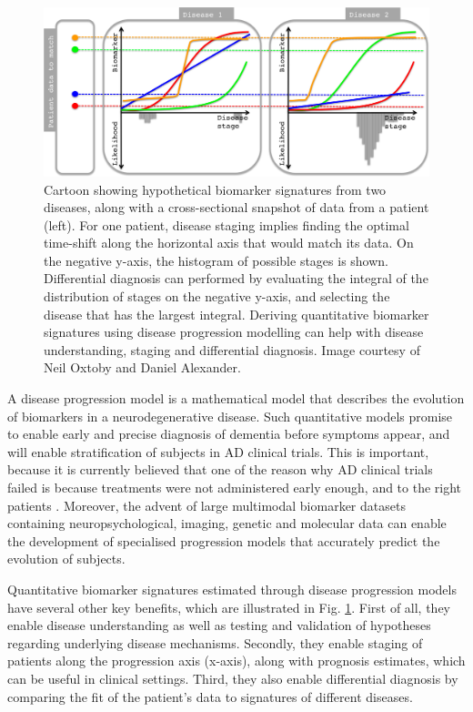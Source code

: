 \begin{figure}
\centering
\includegraphics[width=1\textwidth]{images/dpmDiffDiag2}
\caption[Hypothetical biomarker signatures in two diseases]{Cartoon showing hypothetical biomarker signatures from two diseases, along with a cross-sectional snapshot of data from a patient (left). For one patient, disease staging implies finding the optimal time-shift along the horizontal axis that would match its data. On the negative y-axis, the histogram of possible stages is shown. Differential diagnosis can performed by evaluating the integral of the distribution of stages on the negative y-axis, and selecting the disease that has the largest integral. Deriving quantitative biomarker signatures using disease progression modelling can help with disease understanding, staging and differential diagnosis. Image courtesy of Neil Oxtoby and Daniel Alexander.}
\label{fig:bckDpmImg}
\end{figure}

A disease progression model is a mathematical model that describes the evolution of biomarkers in a neurodegenerative disease. Such quantitative models promise to enable early and precise diagnosis of dementia before symptoms appear, and will enable stratification of subjects in AD clinical trials. This is important, because it is currently believed that one of the reason why AD clinical trials failed is because treatments were not administered early enough, and to the right patients \cite{mehta2017trials}. Moreover, the advent of large multimodal biomarker datasets containing neuropsychological, imaging, genetic and molecular data can enable the development of specialised progression models that accurately predict the evolution of subjects. 

Quantitative biomarker signatures estimated through disease progression models have several other key benefits, which are illustrated in Fig. \ref{fig:bckDpmImg}. First of all, they enable disease understanding as well as testing and validation of hypotheses regarding underlying disease mechanisms. Secondly, they enable staging of patients along the progression axis (x-axis), along with prognosis estimates, which can be useful in clinical settings. Third, they also enable differential diagnosis by comparing the fit of the patient's data to signatures of different diseases. 

